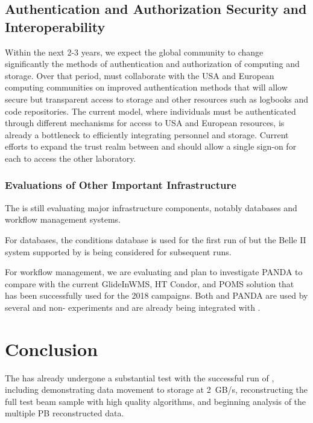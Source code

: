 \subsection{Authentication and Authorization Security and Interoperability}\label{ch-comp-auth}

Within the next 2-3 years, we expect the global  community to change significantly the methods of authentication and authorization of computing and storage. 
Over that period,  must collaborate with the USA and European  computing communities on improved authentication methods  that will allow secure but transparent access to storage and other resources such as logbooks and code repositories.  The current model, where individuals must be authenticated through different mechanisms for access to USA and European resources, is already a bottleneck to efficiently integrating personnel and storage. 
Current efforts to expand the trust realm between  and  should allow a single sign-on for each to access the other laboratory.


\subsubsection{Evaluations of Other Important Infrastructure}

The   is still evaluating major infrastructure components, notably databases and workflow management systems.

For databases\cite{Laycock:2019ynk}, the  conditions database is used for the first run of  but the Belle II\cite{Ritter:2018jxh} system supported by  is being considered for subsequent runs. 

For workflow management, we are evaluating \cite{Falabella:2016waj} and plan to investigate PANDA\cite{Megino:2017ywl} to compare with the current GlideInWMS, HT Condor, and POMS solution that has been successfully used for the 2018  campaigns.
Both  and PANDA are used by several  and non- experiments and are already being integrated with . 


\section{Conclusion}

The   has already undergone a substantial test with the successful run of , including demonstrating data movement to storage at \SI{2}{GB/s}, reconstructing the full test beam sample with high quality algorithms, and beginning analysis of the multiple PB reconstructed data. 

